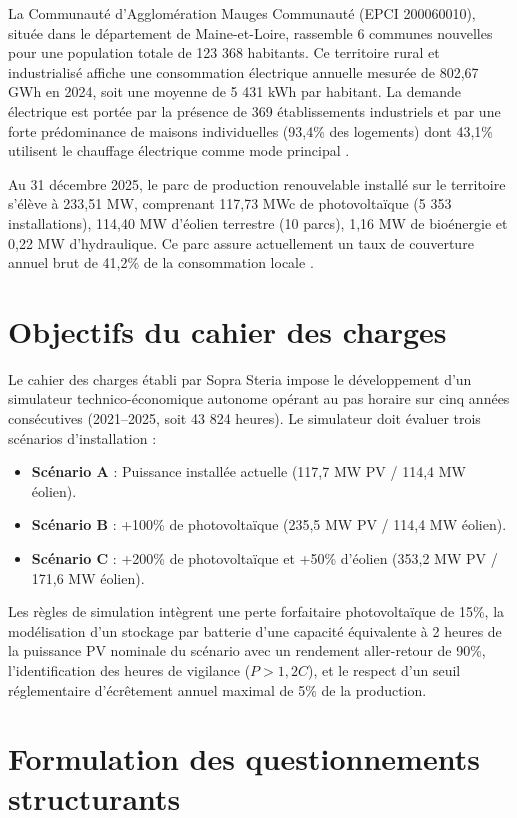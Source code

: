 \documentclass[12pt, a4paper]{report}
\begin{document}
La Communauté d'Agglomération Mauges Communauté (EPCI 200060010), située dans le département de Maine-et-Loire, rassemble 6 communes nouvelles pour une population totale de 123 368 habitants. Ce territoire rural et industrialisé affiche une consommation électrique annuelle mesurée de 802,67 GWh en 2024, soit une moyenne de 5 431 kWh par habitant. La demande électrique est portée par la présence de 369 établissements industriels et par une forte prédominance de maisons individuelles (93,4\% des logements) dont 43,1\% utilisent le chauffage électrique comme mode principal \cite{insee_rp,odre_conso}.

Au 31 décembre 2025, le parc de production renouvelable installé sur le territoire s'élève à 233,51 MW, comprenant 117,73 MWc de photovoltaïque (5 353 installations), 114,40 MW d'éolien terrestre (10 parcs), 1,16 MW de bioénergie et 0,22 MW d'hydraulique. Ce parc assure actuellement un taux de couverture annuel brut de 41,2\% de la consommation locale \cite{odre_registre}.

\section*{Objectifs du cahier des charges}

Le cahier des charges établi par Sopra Steria impose le développement d'un simulateur technico-économique autonome opérant au pas horaire sur cinq années consécutives (2021--2025, soit 43 824 heures). Le simulateur doit évaluer trois scénarios d'installation :
\begin{itemize}
  \item \textbf{Scénario A} : Puissance installée actuelle (117,7 MW PV / 114,4 MW éolien).
  \item \textbf{Scénario B} : +100\% de photovoltaïque (235,5 MW PV / 114,4 MW éolien).
  \item \textbf{Scénario C} : +200\% de photovoltaïque et +50\% d'éolien (353,2 MW PV / 171,6 MW éolien).
\end{itemize}

Les règles de simulation intègrent une perte forfaitaire photovoltaïque de 15\%, la modélisation d'un stockage par batterie d'une capacité équivalente à 2 heures de la puissance PV nominale du scénario avec un rendement aller-retour de 90\%, l'identification des heures de vigilance ($P > 1,2 C$), et le respect d'un seuil réglementaire d'écrêtement annuel maximal de 5\% de la production.

\section*{Formulation des questionnements structurants}
\end{document}
